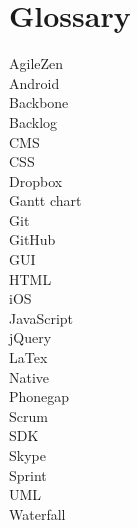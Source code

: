 \chapter{Glossary}


\begin{description}
   \item[AgileZen]
   \item[Android]
   \item[Backbone]
   \item[Backlog]
   \item[CMS]
   \item[CSS]
   \item[Dropbox]
   \item[Gantt chart]
   \item[Git]
   \item[GitHub]
   \item[GUI]
   \item[HTML]
   \item[iOS]
   \item[JavaScript]
   \item[jQuery]
   \item[LaTex]
   \item[Native]
   \item[Phonegap]
   \item[Scrum]
   \item[SDK]
   \item[Skype]
   \item[Sprint]
   \item[UML] 
   \item[Waterfall]  
\end{description}